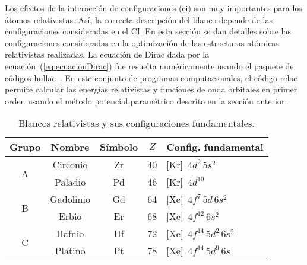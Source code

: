 Los efectos de la interacción de configuraciones (\acs{ci}) son muy 
importantes para los átomos relativistas. Así, la correcta descripción 
del blanco depende de las configuraciones consideradas en el CI. En 
esta sección se dan detalles sobre las configuraciones consideradas en 
la optimización de las estructuras atómicas relativistas realizadas.
La ecuación de Dirac dada por la ecuación~(\ref{eq:ecuacionDirac}) fue 
resuelta numéricamente usando el paquete de códigos 
{\sc hullac}~\cite{BarShalom:01}. En este conjunto de programas 
computacionales, el código {\sc relac} permite calcular las energías 
relativistas y funciones de onda orbitales en primer orden usando el 
método potencial paramétrico descrito en la sección anterior. 

\begin{table*}[t]
\centering
\begin{tabular}{|c|c|c|c|l|}
\hline
Grupo & Nombre   & Símbolo & $Z$ & Config. fundamental \\
\hline
\hline
\multirow{2}{*}{A} & Circonio & Zr & 40 & [Kr]~$4d^2\,5s^2$ \\
                   & Paladio  & Pd & 46 & [Kr]~$4d^{10}$ \\
\hline
\multirow{2}{*}{B} & Gadolinio & Gd & 64 & [Xe]~$4f^7\,5d\,6s^2$ \\
                   & Erbio     & Er & 68 & [Xe]~$4f^{12}\,6s^2$ \\
\hline
\multirow{2}{*}{C} & Hafnio  & Hf & 72 & [Xe]~$4f^{14}\,5d^2\,6s^2$ \\
                   & Platino & Pt & 78 & [Xe]~$4f^{14}\,5d^9\,6s$ \\
\hline
\end{tabular}
\caption[Blancos relativistas y sus configuraciones fundamentales]
{Blancos relativistas y sus configuraciones fundamentales.}
\label{tab:gruposrelat} 
\end{table*}

